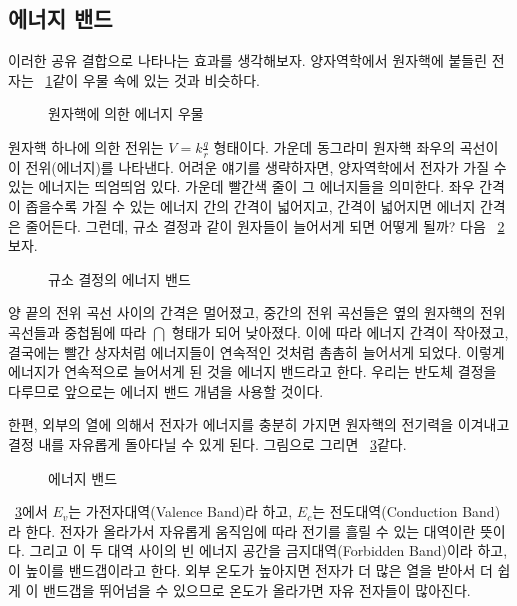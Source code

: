 \subsection{에너지 밴드}
이러한 공유 결합으로 나타나는 효과를 생각해보자. 양자역학에서 원자핵에 붙들린 전자는 \figurename~\ref{fig:atom well}\과 같이 우물 속에 있는 것과 비슷하다.
\begin{figure}[!hbp]
    \centering
    \caption{원자핵에 의한 에너지 우물}\label{fig:atom well}
\end{figure}
원자핵 하나에 의한 전위는 $V=k\frac{q}{r}$ 형태이다. 가운데 동그라미 원자핵 좌우의 곡선이 이 전위(에너지)를 나타낸다.
어려운 얘기를 생략하자면, 양자역학에서 전자가 가질 수 있는 에너지는 띄엄띄엄 있다. 가운데 빨간색 줄이 그 에너지들을 의미한다. 좌우 간격이 좁을수록 가질 수 있는 에너지 간의 간격이 넓어지고, 간격이 넓어지면 에너지 간격은 줄어든다.
그런데, 규소 결정과 같이 원자들이 늘어서게 되면 어떻게 될까? 다음 \figurename~\ref{fig:si crystal energy band}\을 보자.
\begin{figure}[!hbp]
    \centering
    \caption{규소 결정의 에너지 밴드}\label{fig:si crystal energy band}
\end{figure}
양 끝의 전위 곡선 사이의 간격은 멀어졌고, 중간의 전위 곡선들은 옆의 원자핵의 전위 곡선들과 중첩됨에 따라 $\bigcap $ 형태가 되어 낮아졌다. 이에 따라 에너지 간격이 작아졌고, 결국에는 빨간 상자처럼 에너지들이 연속적인 것처럼 촘촘히 늘어서게 되었다.
이렇게 에너지가 연속적으로 늘어서게 된 것을 에너지 밴드라고 한다. 우리는 반도체 결정을 다루므로 앞으로는 에너지 밴드 개념을 사용할 것이다.

한편, 외부의 열에 의해서 전자가 에너지를 충분히 가지면 원자핵의 전기력을 이겨내고 결정 내를 자유롭게 돌아다닐 수 있게 된다. 그림으로 그리면 \figurename~\ref{fig:energy band}\와 같다.
\begin{figure}[!hbp]
    \centering
    \caption{에너지 밴드}\label{fig:energy band}
\end{figure}

\figurename~\ref{fig:energy band}에서 $E_v$는 가전자대역(Valence Band)라 하고, $E_c$는 전도대역(Conduction Band)라 한다. 전자가 올라가서 자유롭게 움직임에 따라 전기를 흘릴 수 있는 대역이란 뜻이다.
그리고 이 두 대역 사이의 빈 에너지 공간을 금지대역(Forbidden Band)이라 하고, 이 높이를 밴드갭이라고 한다. 외부 온도가 높아지면 전자가 더 많은 열을 받아서 더 쉽게 이 밴드갭을 뛰어넘을 수 있으므로 온도가 올라가면 자유 전자들이 많아진다.

